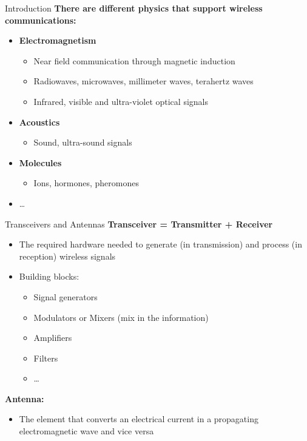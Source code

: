 \documentclass[aspectratio=169,11pt]{beamer}
\begin{document}
\begin{frame}{Introduction}
    \textbf{There are different physics that support wireless communications:}
    \begin{itemize}
        \item \textbf{Electromagnetism}
        \begin{itemize}
            \item Near field communication through magnetic induction
            \item Radiowaves, microwaves, millimeter waves, terahertz waves
            \item Infrared, visible and ultra-violet optical signals
        \end{itemize}
        \item \textbf{Acoustics}
        \begin{itemize}
            \item Sound, ultra-sound signals
        \end{itemize}
        \item \textbf{Molecules}
        \begin{itemize}
            \item Ions, hormones, pheromones
        \end{itemize}
        \item \ldots
    \end{itemize}
\end{frame}

\begin{frame}{Transceivers and Antennas}
    \textbf{Transceiver = Transmitter + Receiver}
    \begin{itemize}
        \item The required hardware needed to generate (in transmission) and process (in reception) wireless signals
        \item Building blocks:
        \begin{itemize}
            \item Signal generators
            \item Modulators or Mixers (mix in the information)
            \item Amplifiers
            \item Filters
            \item \ldots
        \end{itemize}
    \end{itemize}
    
    \vspace{0.3cm}
    \textbf{Antenna:}
    \begin{itemize}
        \item The element that converts an electrical current in a propagating electromagnetic wave and vice versa
    \end{itemize}
\end{frame}
\end{document}
